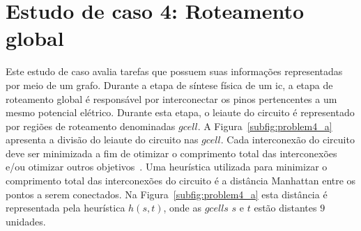 \section{Estudo de caso 4: Roteamento global}
\label{sec:estudo_de_caso_4}

Este estudo de caso avalia tarefas que possuem suas informações representadas por meio de um grafo.
Durante a etapa de síntese física de um \ac{ic}, a etapa de roteamento global é responsável por interconectar os pinos pertencentes a um mesmo potencial elétrico.
Durante esta etapa, o leiaute do circuito é representado por regiões de roteamento denominadas $gcell$.
A Figura~\ref{subfig:problem4_a} apresenta a divisão do leiaute do circuito nas $gcell$.
Cada interconexão do circuito deve ser minimizada a fim de otimizar o comprimento total das interconexões e/ou otimizar outros objetivos~\cite{kahng2011vlsi}.
Uma heurística utilizada para minimizar o comprimento total das interconexões do circuito é a distância Manhattan entre os pontos a serem conectados.
Na Figura~\ref{subfig:problem4_a} esta distância é representada pela heurística $h(s, t)$, onde as $gcells$ $s$ e $t$ estão distantes $9$ unidades.


